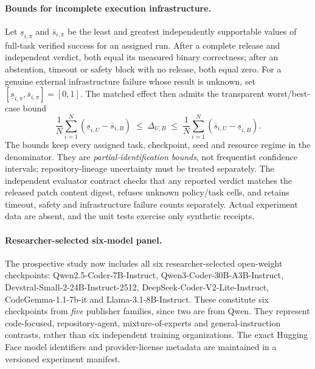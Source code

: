 \documentclass[pdflatex,sn-basic]{sn-jnl}
\begin{document}
\paragraph{Bounds for incomplete execution infrastructure.}
Let $\underline s_{i,\pi}$ and
$\overline s_{i,\pi}$ be the least and
greatest independently supportable values
of full-task verified success for an
assigned run. After a complete release and
independent verdict, both equal its measured
binary correctness; after an abstention,
timeout or safety block with no release,
both equal zero. For a genuine external
infrastructure failure whose result is
unknown, set
$[\underline s_{i,\pi},\overline s_{i,\pi}]
=[0,1]$. The matched effect then admits
the transparent worst/best-case bound
\begin{equation}
 \frac{1}{N}\sum_{i=1}^{N}
  (\underline s_{i,U}-\overline s_{i,B})
 \;\leq\;\Delta_{U,B}\;\leq\;
 \frac{1}{N}\sum_{i=1}^{N}
  (\overline s_{i,U}-\underline s_{i,B}).
 \label{eq:attrition-bounds}
\end{equation}
The bounds keep every assigned task,
checkpoint, seed and resource regime
in the denominator. They are
\emph{partial-identification bounds},
not frequentist confidence intervals;
repository-lineage uncertainty must
be treated separately. The independent
evaluator contract checks that any
reported verdict matches the released
patch content digest, refuses unknown
policy/task cells, and retains timeout,
safety and infrastructure failure
counts separately. Actual experiment
data are absent, and the unit tests
exercise only synthetic receipts.

\paragraph{Researcher-selected six-model panel.}
The prospective study now includes all six researcher-selected
open-weight checkpoints: Qwen2.5-Coder-7B-Instruct,
Qwen3-Coder-30B-A3B-Instruct,
Devstral-Small-2-24B-Instruct-2512,
DeepSeek-Coder-V2-Lite-Instruct,
CodeGemma-1.1-7b-it and Llama-3.1-8B-Instruct.
These constitute six checkpoints from \emph{five} publisher
families, since two are from Qwen. They represent code-focused,
repository-agent, mixture-of-experts and general-instruction
contrasts, rather than six independent training organizations.
The exact Hugging Face model identifiers and provider-license
metadata are maintained in a versioned experiment manifest.
\end{document}
